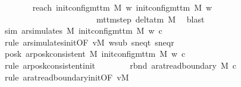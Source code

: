 \begin{isabellebody}
\ \ \ \ \ \ \isamarkupfalse%
\ reach{}{\isacharcolon}{\kern0pt}\ {\isachardoublequoteopen}{\isacharparenleft}{\kern0pt}init{\isacharunderscore}{\kern0pt}config{\isacharunderscore}{\kern0pt}mttm\ M\ w{\isacharcomma}{\kern0pt}\ init{\isacharunderscore}{\kern0pt}config{\isacharunderscore}{\kern0pt}mttm\ M\ w{\isacharparenright}{\kern0pt}\isanewline
\ \ \ \ \ \ \ \ \ \ \ \ \ \ \ \ \ \ \ \ \ \ {\isasymin}\ {\isacharparenleft}{\kern0pt}mttm{\isacharunderscore}{\kern0pt}step\ {\isacharparenleft}{\kern0pt}delta{\isacharunderscore}{\kern0pt}tm\ M{\isacharparenright}{\kern0pt}{\isacharparenright}{\kern0pt}\isactrlsup {\isacharasterisk}{\kern0pt}{\isachardoublequoteclose}\ \isamarkupfalse%
\ blast\isanewline
\ \ \ \ \ \ \isamarkupfalse%
\ sim{\isacharcolon}{\kern0pt}\ {\isachardoublequoteopen}ar{\isacharunderscore}{\kern0pt}simulates\ M\ {\isacharparenleft}{\kern0pt}init{\isacharunderscore}{\kern0pt}config{\isacharunderscore}{\kern0pt}mttm\ M\ w{\isacharparenright}{\kern0pt}\ {\isacharquery}{\kern0pt}c{\isacharprime}{\kern0pt}{\isachardoublequoteclose}\isanewline
\ \ \ \ \ \ \ \ \isamarkupfalse%
\ {\isacharparenleft}{\kern0pt}rule\ ar{\isacharunderscore}{\kern0pt}simulates{\isacharunderscore}{\kern0pt}init{\isacharbrackleft}{\kern0pt}OF\ vM\ w{\isacharunderscore}{\kern0pt}sub\ s{\isacharunderscore}{\kern0pt}neq{\isacharunderscore}{\kern0pt}t\ s{\isacharunderscore}{\kern0pt}neq{\isacharunderscore}{\kern0pt}r{\isacharbrackright}{\kern0pt}{\isacharparenright}{\kern0pt}\isanewline
\ \ \ \ \ \ \isamarkupfalse%
\ posk{\isacharcolon}{\kern0pt}\ {\isachardoublequoteopen}ar{\isacharunderscore}{\kern0pt}posk{\isacharunderscore}{\kern0pt}consistent\ M\ {\isacharparenleft}{\kern0pt}init{\isacharunderscore}{\kern0pt}config{\isacharunderscore}{\kern0pt}mttm\ M\ w{\isacharparenright}{\kern0pt}\ {\isacharquery}{\kern0pt}c{\isacharprime}{\kern0pt}{\isachardoublequoteclose}\isanewline
\ \ \ \ \ \ \ \ \isamarkupfalse%
\ {\isacharparenleft}{\kern0pt}rule\ ar{\isacharunderscore}{\kern0pt}posk{\isacharunderscore}{\kern0pt}consistent{\isacharunderscore}{\kern0pt}init{\isacharparenright}{\kern0pt}\isanewline
\ \ \ \ \ \ \isamarkupfalse%
\ rbnd{\isacharcolon}{\kern0pt}\ {\isachardoublequoteopen}ar{\isacharunderscore}{\kern0pt}at{\isacharunderscore}{\kern0pt}read{\isacharunderscore}{\kern0pt}boundary\ M\ {\isacharquery}{\kern0pt}c{\isacharprime}{\kern0pt}{\isachardoublequoteclose}\isanewline
\ \ \ \ \ \ \ \ \isamarkupfalse%
\ {\isacharparenleft}{\kern0pt}rule\ ar{\isacharunderscore}{\kern0pt}at{\isacharunderscore}{\kern0pt}read{\isacharunderscore}{\kern0pt}boundary{\isacharunderscore}{\kern0pt}init{\isacharbrackleft}{\kern0pt}OF\ vM{\isacharbrackright}{\kern0pt}{\isacharparenright}{\kern0pt}\isanewline

\end{isabellebody}
